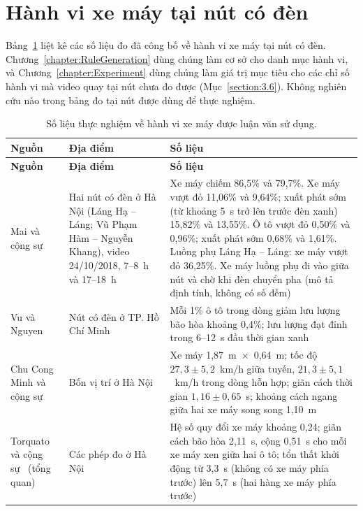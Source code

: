 \documentclass[../main.tex]{subfiles}
\begin{document}
\section{Hành vi xe máy tại nút có đèn}
\label{section:2.context}
\label{subsection:2.1.3}

Bảng~\ref{table:2.1} liệt kê các số liệu đo đã công bố về hành vi xe máy tại nút có đèn. Chương~\ref{chapter:RuleGeneration} dùng chúng làm cơ sở cho danh mục hành vi, và Chương~\ref{chapter:Experiment} dùng chúng làm giá trị mục tiêu cho các chỉ số hành vi mà video quay tại nút chưa đo được (Mục~\ref{section:3.6}). Không nghiên cứu nào trong bảng đo tại nút được dùng để thực nghiệm.

\begingroup\small
\begin{longtable}{|>{\raggedright\arraybackslash}p{3.1cm}|>{\raggedright\arraybackslash}p{3.4cm}|>{\raggedright\arraybackslash}p{7.1cm}|}
\caption{Số liệu thực nghiệm về hành vi xe máy được luận văn sử dụng.}\label{table:2.1}\\
\hline
\textbf{Nguồn} & \textbf{Địa điểm} & \textbf{Số liệu} \\
\hline
\endfirsthead
\hline
\textbf{Nguồn} & \textbf{Địa điểm} & \textbf{Số liệu} \\
\hline
\endhead
Mai và cộng sự~\cite{mai2019signal} & Hai nút có đèn ở Hà Nội (Láng Hạ -- Láng; Vũ Phạm Hàm -- Nguyễn Khang), video 24/10/2018, 7--8~h và 17--18~h & Xe máy chiếm 86,5\% và 79,7\%. Xe máy vượt đỏ 11,06\% và 9,64\%; xuất phát sớm (từ khoảng 5~s trở lên trước đèn xanh) 15,82\% và 13,55\%. Ô tô vượt đỏ 0,50\% và 0,96\%; xuất phát sớm 0,68\% và 1,61\%. Luồng phụ Láng Hạ -- Láng: xe máy vượt đỏ 36,25\%. Xe máy luồng phụ đi vào giữa nút và chờ khi đèn chuyển pha (mô tả định tính, không có số đếm) \\
\hline
Vu và Nguyen~\cite{vu2015saturation} & Nút có đèn ở TP. Hồ Chí Minh & Mỗi 1\% ô tô trong dòng giảm lưu lượng bão hòa khoảng 0,4\%; lưu lượng đạt đỉnh trong 6--12~s đầu thời gian xanh \\
\hline
Chu Cong Minh và cộng sự~\cite{chu2005speed} & Bốn vị trí ở Hà Nội & Xe máy 1,87~m~$\times$~0,64~m; tốc độ $27{,}3 \pm 5{,}2$~km/h giữa tuyến, $21{,}3 \pm 5{,}1$~km/h trong dòng hỗn hợp; giãn cách thời gian $1{,}16 \pm 0{,}65$~s; khoảng cách ngang giữa hai xe máy song song 1,10~m \\
\hline
Torquato và cộng sự~\cite{torquato2020motorcycles} (tổng quan) & Các phép đo ở Hà Nội & Hệ số quy đổi xe máy khoảng 0,24; giãn cách bão hòa 2,11~s, cộng 0,51~s cho mỗi xe máy xen giữa hai ô tô; tổn thất khởi động từ 3,3~s (không có xe máy phía trước) lên 5,7~s (hai hàng xe máy phía trước) \\

\end{longtable}
\end{document}

